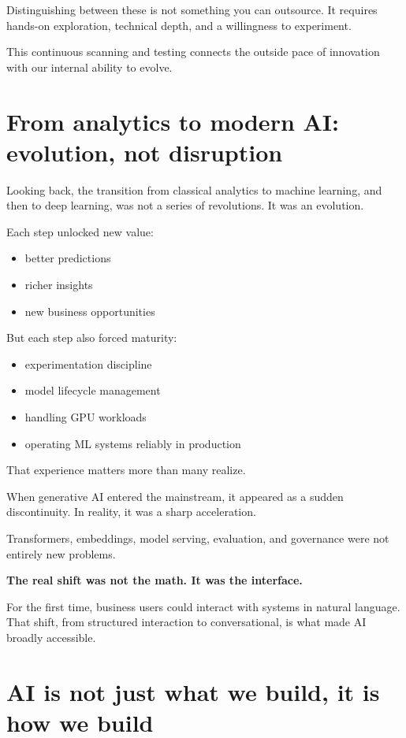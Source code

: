 \documentclass[11pt]{article}
\begin{document}
Distinguishing between these is not something you can outsource. It requires hands-on exploration, technical depth, and a willingness to experiment.

This continuous scanning and testing connects the outside pace of innovation with our internal ability to evolve.

\section*{From analytics to modern AI: evolution, not disruption}

Looking back, the transition from classical analytics to machine learning, and then to deep learning, was not a series of revolutions. It was an evolution.

Each step unlocked new value:

\begin{itemize}
\item better predictions
\item richer insights
\item new business opportunities
\end{itemize}

But each step also forced maturity:

\begin{itemize}
\item experimentation discipline
\item model lifecycle management
\item handling GPU workloads
\item operating ML systems reliably in production
\end{itemize}

That experience matters more than many realize.

When generative AI entered the mainstream, it appeared as a sudden discontinuity. In reality, it was a sharp acceleration.

Transformers, embeddings, model serving, evaluation, and governance were not entirely new problems.

\textbf{The real shift was not the math. It was the interface.}

For the first time, business users could interact with systems in natural language. That shift, from structured interaction to conversational, is what made AI broadly accessible.

\section*{AI is not just what we build, it is how we build}
\end{document}
